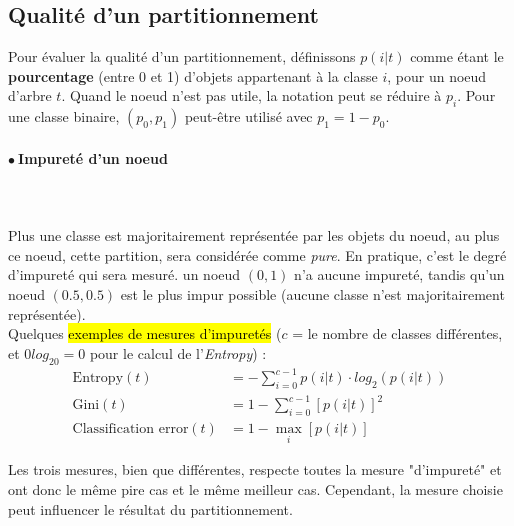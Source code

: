 \documentclass[letterpaper, 12pt]{article}
\newcommand{\alinea}{
\hspace*{0.5cm}}
\newcommand{\point}{$\bullet\ $}
\begin{document}
		\subsection{Qualité d'un partitionnement}\label{sec:tree:split}
			\alinea Pour évaluer la qualité d'un partitionnement, définissons
				$p(i|t)$ comme étant le \textbf{pourcentage} (entre 0 et 1)
				d'objets appartenant à
				la classe $i$, pour un noeud d'arbre $t$. Quand le noeud
				n'est pas utile, la notation peut se réduire à $p_i$.
				Pour une classe binaire, $(p_0, p_1)$ peut-être utilisé
				avec $p_1 = 1 - p_0$.
			\paragraph{\point Impureté d'un noeud}~\\~\\
			\alinea Plus une classe est majoritairement représentée par les 
				objets du noeud, au plus ce noeud, cette partition, sera
				considérée comme \textit{pure}. En pratique, c'est le degré
				d'impureté qui sera mesuré. un noeud $(0, 1)$ n'a aucune 
				impureté, tandis qu'un noeud $(0.5, 0.5)$ est le plus impur
				possible (aucune classe n'est majoritairement représentée).\\
			\alinea Quelques \hl{exemples de mesures d'impuretés} ($c$
				= le nombre de classes différentes, et $0log_20 = 0$
				pour le calcul de l'\textit{Entropy}) :
			\begin{align*}
				\text{Entropy}(t) &= -\sum^{c-1}_{i=0} p(i|t) 
					\cdot log_2 (p(i|t))\\
				\text{Gini}(t)    &= 1- \sum^{c-1}_{i=0}[p(i|t)]^2\\
				\text{Classification error}(t) &= 1-\max_{i}[p(i|t)]
			\end{align*}
			\alinea Les trois mesures, bien que différentes, respecte
				toutes la mesure "d'impureté" et ont donc le même pire cas
				et le même meilleur cas. Cependant, la mesure choisie peut
				influencer le résultat du partitionnement.
\end{document}
